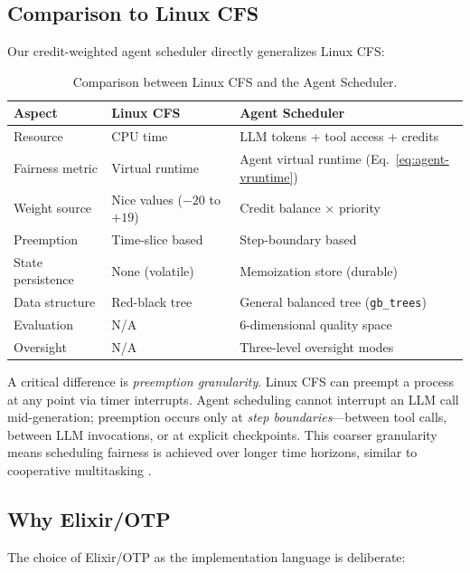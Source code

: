 \documentclass[12pt,a4paper]{article}
\theoremstyle{definition}
\theoremstyle{remark}
\begin{document}
\subsection{Comparison to Linux CFS}

Our credit-weighted agent scheduler directly generalizes Linux CFS:

\begin{table}[H]
\centering
\begin{tabular}{@{}lll@{}}
\toprule
\textbf{Aspect} & \textbf{Linux CFS} & \textbf{Agent Scheduler} \\
\midrule
Resource & CPU time & LLM tokens + tool access + credits \\
Fairness metric & Virtual runtime & Agent virtual runtime (Eq.~\ref{eq:agent-vruntime}) \\
Weight source & Nice values ($-20$ to $+19$) & Credit balance $\times$ priority \\
Preemption & Time-slice based & Step-boundary based \\
State persistence & None (volatile) & Memoization store (durable) \\
Data structure & Red-black tree & General balanced tree (\texttt{gb\_trees}) \\
Evaluation & N/A & 6-dimensional quality space \\
Oversight & N/A & Three-level oversight modes \\
\bottomrule
\end{tabular}
\caption{Comparison between Linux CFS and the Agent Scheduler.}\label{tab:cfs-comparison}
\end{table}

A critical difference is \emph{preemption granularity}. Linux CFS can preempt a process at any point via timer interrupts. Agent scheduling cannot interrupt an LLM call mid-generation; preemption occurs only at \emph{step boundaries}---between tool calls, between LLM invocations, or at explicit checkpoints. This coarser granularity means scheduling fairness is achieved over longer time horizons, similar to cooperative multitasking \citep{tanenbaum2014modern}.

\subsection{Why Elixir/OTP}

The choice of Elixir/OTP as the implementation language is deliberate:
\end{document}
